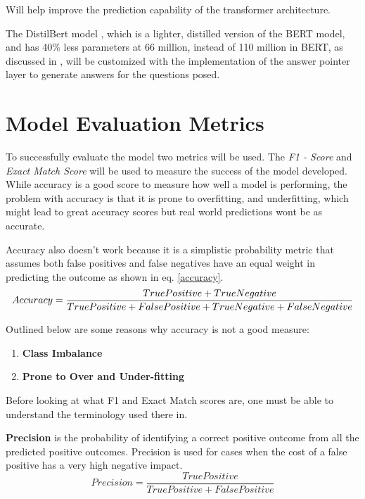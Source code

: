\documentclass[a4paper,12pt]{report}
\begin{document}
	Will help improve the prediction capability of the transformer architecture. 
	
	The DistilBert model \citep{distil}, which is a lighter, distilled version of the BERT model, and has 40\% less parameters at 66 million, instead of 110 million in BERT, as discussed in \citep{bert}, will be customized with the implementation of the answer pointer layer to generate answers for the questions posed. 
	
	
	\section{Model Evaluation Metrics}\label{33}
	
		To successfully evaluate the model two metrics will be used. The \textit{F1 - Score} and \textit{Exact Match Score} will be used to measure the success of the model developed. While accuracy is a good score to measure how well a model is performing, the problem with accuracy is that it is prone to overfitting, and underfitting, which might lead to great accuracy scores but real world predictions wont be as accurate.
		
		Accuracy also doesn't work because it is a simplistic probability metric that assumes both false positives and false negatives have an equal weight in predicting the outcome as shown in eq. \ref{accuracy}.
				\begin{equation}\label{accuracy}
			Accuracy = \small \dfrac{True Positive + True Negative}{True Positive + False Positive + True Negative + False Negative}
		\end{equation}

		Outlined below are some reasons why accuracy is not a good measure:
		\begin{enumerate}
			\item \textbf{Class Imbalance}
			\item \textbf{Prone to Over and Under-fitting}
		\end{enumerate}
	
	Before looking at what F1 and Exact Match scores are, one must be able to understand the terminology used there in. 

	\textbf{Precision} is the probability of identifying a correct positive outcome from all the predicted positive outcomes. Precision is used for cases when the cost of a false positive has a very high negative impact.
	\begin{equation}\label{precision}
		Precision = \dfrac{True Positive}{True Positive +  False Positive }
	\end{equation}
	
\end{document}
